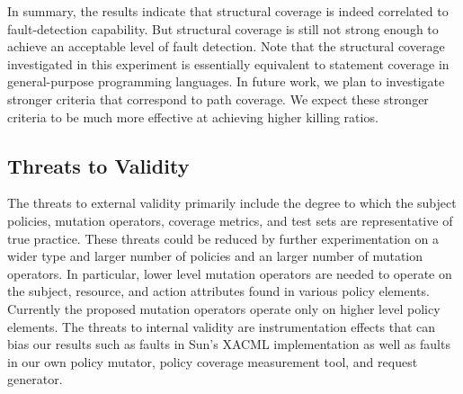 In summary, the results indicate that structural coverage is indeed
correlated to fault-detection capability. But structural coverage is
still not strong enough to achieve an acceptable level of fault
detection. Note that the structural coverage investigated in this
experiment is essentially equivalent to statement coverage in
general-purpose programming languages. In future work, we plan to
investigate stronger criteria that correspond to path coverage. We
expect these stronger criteria to be much more effective at
achieving higher killing ratios.

\subsection{Threats to Validity}

The threats to external validity primarily include the degree to
which the subject policies, mutation operators, coverage metrics,
and test sets are representative of true practice. These threats
could be reduced by further experimentation on a wider type and
larger number of policies and an larger number of mutation
operators. In particular, lower level mutation operators are needed
to operate on the subject, resource, and action attributes found in
various policy elements. Currently the proposed mutation operators
operate only on higher level policy elements. The threats to
internal validity are instrumentation effects that can bias our
results such as faults in Sun's XACML implementation as well as
faults in our own policy mutator, policy coverage measurement tool,
and request generator.


